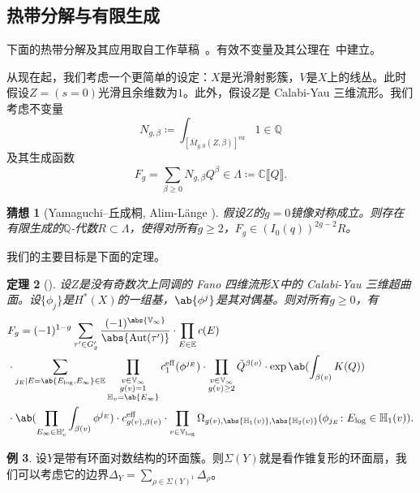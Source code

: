 \documentclass{amsart}
\newtheorem{thm}{定理}[section]
\newtheorem{conj}[thm]{猜想}
\theoremstyle{definition}
\newtheorem{exm}[thm]{例}
\theoremstyle{remark}
\theoremstyle{plain}
\theoremstyle{definition}
\theoremstyle{remark}
\newcommand{\C}{\mathbb{C}}
\newcommand{\Q}{\mathbb{Q}}
\newcommand{\E}{\mathbb{E}}
\newcommand{\V}{\mathbb{V}}
\renewcommand{\H}{\mathbb{H}}
\newcommand{\mr}[1]{\mathrm{#1}}
\newcommand{\on}[1]{\operatorname{#1}}
\newcommand{\1}{\mathbf{1}}
\newcommand{\2}{\mathbf{2}}
\newcommand{\3}{\mathbf{3}}
\newcommand{\vir}{\mr{vir}}
\newcommand{\ps}[1]{\llbracket #1 \rrbracket}
\DeclareMathOperator{\Aut}{Aut}
\begin{document}
\subsection{热带分解与有限生成}%
\label{sub:Tropical decomposition and finite generation}

下面的热带分解及其应用取自工作草稿~\cite{CJRtropical2025}。有效不变量及其公理在~\cite{CJRpunctured}中建立。

从现在起，我们考虑一个更简单的设定：\(X\)是光滑射影簇，\(V\)是\(X\)上的线丛。此时假设\(Z = (s = 0)\)光滑且余维数为\(1\)。此外，假设\(Z\)是 Calabi-Yau 三维流形。我们考虑不变量
\[ N_{g, \beta} \coloneqq \int_{[\bar{M}_{g,0}(Z, \beta)]^{\vir}} 1 \in \Q \]
及其生成函数
\[ F_g = \sum_{\beta \geq 0} N_{g, \beta} Q^{\beta} \in \Lambda \coloneqq \C \ps{Q}. \]

\begin{conj}[Yamaguchi--丘成桐, Alim-L\"ange {\cite{YY2004,AlimLange2007}}]
    假设\(Z\)的\(g=0\)镜像对称成立。则存在有限生成的\(\Q\)-代数\(R \subset \Lambda\)，使得对所有\(g \geq 2\)，\(F_g \in (I_0(q))^{2g-2} R\)。
\end{conj}

我们的主要目标是下面的定理。

\begin{thm}[{\cite{CJRtropical2025}}]
    设\(Z\)是没有奇数次上同调的 Fano 四维流形\(X\)中的 Calabi-Yau 三维超曲面。设\(\{\phi_j\}\)是\(H^*(X)\)的一组基，\(\ab\{\phi^j\}\)是其对偶基。则对所有\(g \geq 0\)，有
    \begin{align*}
        &F_g = (-1)^{1-g} \sum_{\tau' \in G_g'} \frac{(-1)^{\abs{\V_{\infty}}}}{\abs{\Aut(\tau')}} \cdot \prod_{E \in \E} c(E) \\
        & \cdot \sum_{j_E \mid E = \ab\{E_{\log}, E_{\infty}\} \in \E} \prod_{\substack{v \in \V_{\infty} \\ g(v)=1 \\ \H_v = \ab\{E_{\infty}\}}} c_1^{\mr{eff}}(\phi^{j_E}) \cdot \prod_{\substack{v \in \V_{\infty} \\ g(v) \geq 2}} \tilde{Q}^{\beta(v)} \cdot \exp \ab(\int_{\beta(v)} K(Q) )  \\
        & \cdot \ab(\prod_{E_{\infty} \in \H_v'}\int_{\beta(v)} \phi^{j_E}) \cdot c_{g(v), \beta(v)}^{\on{eff}} 
         \cdot \prod_{v \in \V_{\log}} \Omega_{g(v), \abs{\H_1(v)}, \abs{\H_2(v)}} (\phi_{j_E} \colon E_{\log} \in \H_1(v)).
    \end{align*}
\end{thm}

\begin{exm}
    设\(Y\)是带有环面对数结构的环面簇。则\(\Sigma(Y)\)就是看作锥复形的环面扇，我们可以考虑它的边界\(\Delta_Y = \sum_{\rho \in \Sigma(Y)^1} \Delta_{\rho}\)。
\end{exm}
\end{document}
